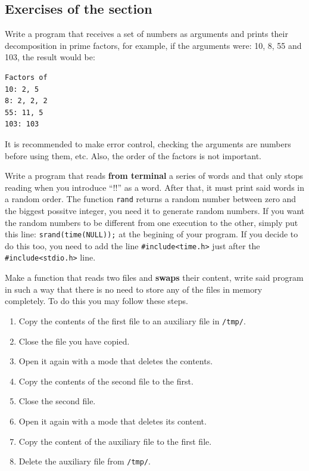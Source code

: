 \documentclass[a4paper]{article}
\begin{document}
\subsection{Exercises of the section}
\begin{exercises}[resume*]
\item Write a program that receives a set of numbers as arguments and prints
their decomposition in prime factors, for example, if the arguments were:
10, 8, 55 and 103, the result would be:

\noindent
\begin{minipage}[H]{\linewidth}
\mbox{}
\begin{verbatim}
Factors of
10: 2, 5
8: 2, 2, 2
55: 11, 5
103: 103
\end{verbatim}
\end{minipage}

It is recommended to make error control, checking the arguments are numbers
before using them, etc. Also, the order of the factors is not important.
\item Write a program that reads \textbf{from terminal} a series of words and
that only stops reading when you introduce ``!!'' as a word. After that, it
must print said words in a random order. The function \verb!rand! returns a
random number between zero and the biggest possitve integer, you need it to
generate random numbers. If you want the random numbers to be different from
one execution to the other, simply put this line: \verb!srand(time(NULL));! at
the begining of your program. If you decide to do this too, you need to add
the line \verb!#include<time.h>! just after the \verb!#include<stdio.h>! line.

\item Make a function that reads two files and \textbf{swaps} their content,
write said program in such a way that there is no need to store any of the files
in memory completely. To do this you may follow these steps.
\begin{enumerate}
    \item Copy the contents of the first file to an auxiliary file in
    \verb!/tmp/!.
    \item Close the file you have copied.
    \item Open it again with a mode that deletes the contents.
    \item Copy the contents of the second file to the first.
    \item Close the second file.
    \item Open it again with a mode that deletes its content.
    \item Copy the content of the auxiliary file to the first file.
    \item Delete the auxiliary file from \verb!/tmp/!.
\end{enumerate}


\end{exercises}
\end{document}
